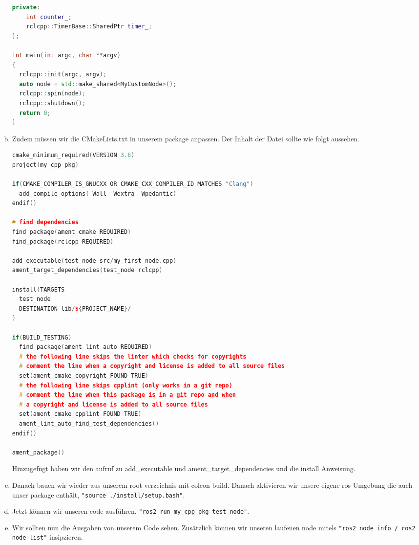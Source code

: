 \documentclass[a4paper,12pt]{article}
\begin{document}
\begin{enumerate}[a)]
{\begin{lstlisting}[language=C++,basicstyle=\fontsize{6.5}{8}\selectfont]
  private:
    int counter_;
    rclcpp::TimerBase::SharedPtr timer_;
};

int main(int argc, char **argv)
{
  rclcpp::init(argc, argv);
  auto node = std::make_shared<MyCustomNode>();
  rclcpp::spin(node);
  rclcpp::shutdown();
  return 0;
}
\end{lstlisting}
}
\item{Zudem müssen wir die CMakeLists.txt in unserem package anpassen. Der Inhalt der Datei sollte wie folgt aussehen.
\begin{lstlisting}[language=C++,basicstyle=\fontsize{6.5}{8}\selectfont]
cmake_minimum_required(VERSION 3.8)
project(my_cpp_pkg)

if(CMAKE_COMPILER_IS_GNUCXX OR CMAKE_CXX_COMPILER_ID MATCHES "Clang")
  add_compile_options(-Wall -Wextra -Wpedantic)
endif()

# find dependencies
find_package(ament_cmake REQUIRED)
find_package(rclcpp REQUIRED)

add_executable(test_node src/my_first_node.cpp)
ament_target_dependencies(test_node rclcpp)

install(TARGETS
  test_node
  DESTINATION lib/${PROJECT_NAME}/
)

if(BUILD_TESTING)
  find_package(ament_lint_auto REQUIRED)
  # the following line skips the linter which checks for copyrights
  # comment the line when a copyright and license is added to all source files
  set(ament_cmake_copyright_FOUND TRUE)
  # the following line skips cpplint (only works in a git repo)
  # comment the line when this package is in a git repo and when
  # a copyright and license is added to all source files
  set(ament_cmake_cpplint_FOUND TRUE)
  ament_lint_auto_find_test_dependencies()
endif()

ament_package()
\end{lstlisting}
Hinzugefügt haben wir den aufruf zu add\_executable und ament\_target\_dependencies und die install Anweisung.}
\item{Danach bauen wir wieder aus unserem root verzeichnis mit colcon build. Danach aktivieren wir unsere eigene ros Umgebung die auch unser package enthält, \lstinline{"source ./install/setup.bash"}.}
\item{Jetzt können wir unseren code ausführen. \lstinline{"ros2 run my_cpp_pkg test_node"}.}
\item{Wir sollten nun die Ausgaben von unserem Code sehen. Zusätzlich können wir unseren laufenen node mitels \lstinline{"ros2 node info / ros2 node list"} insipzieren.}
\end{enumerate}

\end{document}
